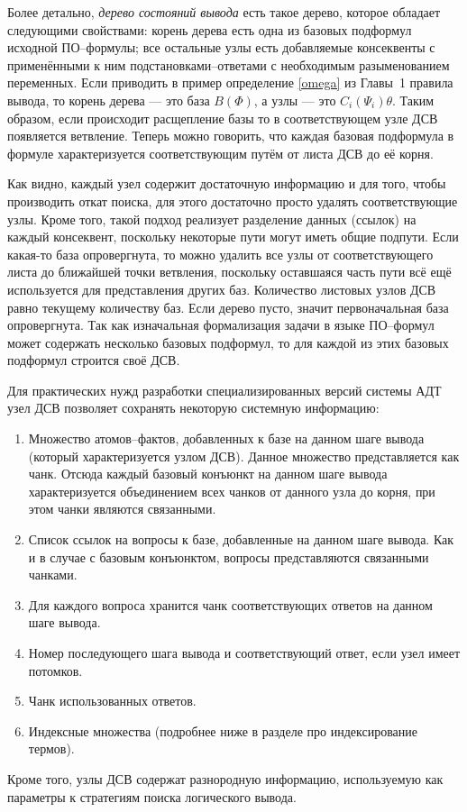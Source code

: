 Более детально, \emph{дерево состояний вывода} есть такое дерево, которое обладает следующими свойствами: корень дерева есть одна из базовых подформул исходной ПО--формулы; все остальные узлы есть добавляемые консеквенты с применёнными к ним подстановками--ответами с необходимым разыменованием переменных. Если приводить в пример определение \ref{omega} из Главы~1 правила вывода, то корень дерева --- это база $B(\Phi)$, а узлы --- это $C_i(\Psi_i)\theta$. Таким образом, если происходит расщепление базы то в соответствующем узле ДСВ появляется ветвление. Теперь можно говорить, что каждая базовая подформула в формуле характеризуется соответствующим путём от листа ДСВ до её корня.

Как видно, каждый узел содержит достаточную информацию и для того, чтобы производить откат поиска, для этого достаточно просто удалять соответствующие узлы. Кроме того, такой подход реализует разделение данных (ссылок) на каждый консеквент, поскольку некоторые пути могут иметь общие подпути. Если какая-то база опровергнута, то можно удалить все узлы от соответствующего листа до ближайшей точки ветвления, поскольку оставшаяся часть пути всё ещё используется для представления других баз. Количество листовых узлов ДСВ равно текущему количеству баз. Если дерево пусто, значит первоначальная база опровергнута. Так как изначальная формализация задачи в языке ПО--формул может содержать несколько базовых подформул, то для каждой из этих базовых подформул строится своё ДСВ.

Для практических нужд разработки специализированных версий системы АДТ узел ДСВ позволяет сохранять некоторую системную информацию:
\begin{enumerate}
\item Множество атомов--фактов, добавленных к базе на данном шаге вывода (который характеризуется узлом ДСВ). Данное множество представляется как чанк. Отсюда каждый базовый конъюнкт на данном шаге вывода характеризуется объединением всех чанков от данного узла до корня, при этом чанки являются связанными.
\item Список ссылок на вопросы к базе, добавленные на данном шаге вывода. Как и в случае с базовым конъюнктом, вопросы представляются связанными чанками.
\item Для каждого вопроса хранится чанк соответствующих ответов на данном шаге вывода.
\item Номер последующего шага вывода и соответствующий ответ, если узел имеет потомков.
\item Чанк использованных ответов.
\item Индексные множества (подробнее ниже в разделе про индексирование термов).
\end{enumerate}
Кроме того, узлы ДСВ содержат разнородную информацию, используемую как параметры к стратегиям поиска логического вывода.

